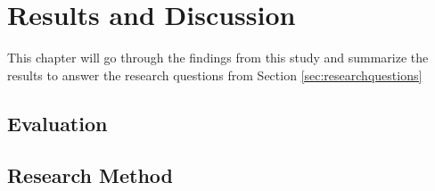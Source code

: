 \chapter{Results and Discussion}
\label{chp:resultsanddiscussion}

This chapter will go through the findings from this study and summarize the results to answer the research questions from Section \ref{sec:researchquestions}


\section{Evaluation}
\label{sec:evaluation}


\section{Research Method}
\label{sec:researchmethod}

